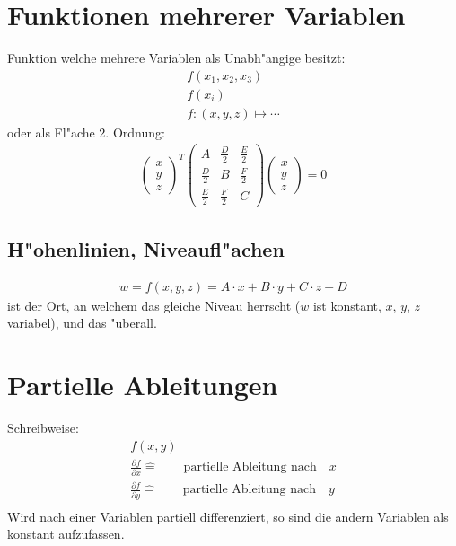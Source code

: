 \section{Funktionen mehrerer Variablen}
Funktion welche mehrere Variablen als Unabh"angige besitzt:
\begin{gather}
  f(x_1, x_2, x_3) \\
  f(x_i) \\
  f: (x, y, z) \longmapsto \cdots
\end{gather}
oder als Fl"ache 2. Ordnung:
\begin{gather}
  {\begin{pmatrix} x \\ y \\ z \end{pmatrix}}^T
	\begin{pmatrix}
		A & \frac{D}{2} & \frac{E}{2} \\
		\frac{D}{2} & B & \frac{F}{2} \\
		\frac{E}{2} & \frac{F}{2} & C
	\end{pmatrix}
	\begin{pmatrix} x \\ y \\ z	\end{pmatrix} = 0
\end{gather}

\subsection{H"ohenlinien, Niveaufl"achen}
\begin{gather}
  w = f(x, y, z) = A\cdot x + B\cdot y + C\cdot z + D
\end{gather}
ist der Ort, an welchem das gleiche Niveau herrscht ($w$ ist konstant, $x$, $y$, $z$ variabel),
und das "uberall.


\section{Partielle Ableitungen}
Schreibweise:
\begin{gather}
  f(x, y) \\
  \frac{\partial f}{\partial x} \hat{=} \qquad\text{partielle Ableitung nach}\quad x \\
  \frac{\partial f}{\partial y} \hat{=} \qquad\text{partielle Ableitung nach}\quad y \\
\end{gather}
Wird nach einer Variablen partiell differenziert, so sind die andern Variablen als
konstant aufzufassen.


